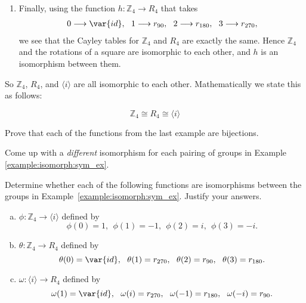 \begin{example}
\begin{enumerate}[(1)]
\item
Finally, using the  function
$h: {\mathbb Z_4} \longrightarrow R_4$  that takes
\begin{align*}
 0\longrightarrow \var{id},~~
    1 \longrightarrow r_{90},~~
    2 \longrightarrow r_{180},~~
    3 \longrightarrow r_{270}, 
\end{align*}
we see that the Cayley tables for ${\mathbb Z_4}$ and $R_4$ are exactly the same.  Hence ${\mathbb Z_4}$ and the rotations of a square are isomorphic to each other, and $h$ is an isomorphism between them.
\end{enumerate}

\noindent
So ${\mathbb Z_4}$, $R_4$, and $\langle i \rangle$ are all isomorphic to each other. Mathematically we state this as follows:

\[ {\mathbb Z_4} \cong  R_4 \cong \langle i \rangle \]
 
 \end{example}
 
 \begin{exercise}\label{exercise:isomorph:iso_5}
 Prove that each of the functions from the last example are bijections.
 \end{exercise}
 
 \begin{exercise}\label{exercise:isomorph:iso_6}
 Come up with a \emph{different} isomorphism for each pairing of groups in Example \ref{example:isomorph:sym_ex}.
 \end{exercise}
 
 \begin{exercise}\label{exercise:isomorph:iso_7}
 Determine whether each of the following functions are isomorphisms between the groups in Example~\ref{example:isomorph:sym_ex}. Justify your answers. 
 \begin{enumerate}[(a)]
 \item
 $ \phi: {\mathbb Z_4}  \longrightarrow \langle i \rangle$ defined by 
\[  
\phi(0) = 1,~~
 \phi(1) = -1,~~
 \phi(2) = i,~~
 \phi(3) = -i.
\]
 
 \item
$ \theta: {\mathbb Z_4}  \longrightarrow R_4$ defined by 
\[ 
\theta(0) = \var{id},~~
 \theta(1) = r_{270},~~
 \theta(2) = r_{90} ,~~
 \theta(3) = r_{180}. 
 \]

 \item
 $ \omega: \langle i \rangle \longrightarrow R_4$ defined by 
\[ 
 \omega(1) = \var{id},~~ 
\omega(i) = r_{270},~~
\omega(-1) = r_{180},~~
 \omega(-i) = r_{90}.
\]
 \end{enumerate}
 \end{exercise}
 
